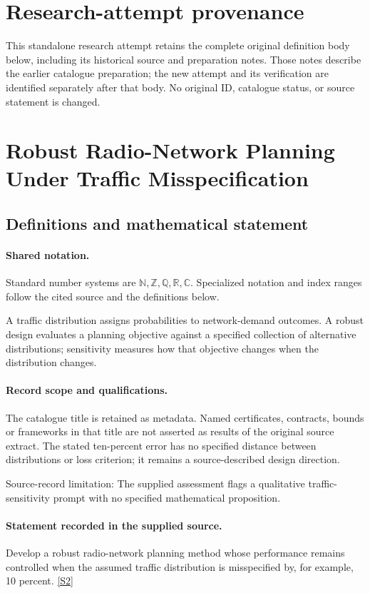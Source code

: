 \documentclass[11pt]{article}
\begin{document}
\section*{Research-attempt provenance}
This standalone research attempt retains the complete original definition body below,
including its historical source and preparation notes. Those notes describe the
earlier catalogue preparation; the new attempt and its verification are identified
separately after that body. No original ID, catalogue status, or source statement is changed.

\section{Robust Radio-Network Planning Under Traffic Misspecification}\label{statement}

\subsection{Definitions and mathematical statement}

\paragraph{Shared notation.}Standard number systems are $\mathbb N,\mathbb Z,\mathbb Q,\mathbb R,\mathbb C$. Specialized notation and index ranges follow the cited source and the definitions below.


A traffic distribution assigns probabilities to network-demand outcomes. A robust design evaluates a planning objective against a specified collection of alternative distributions; sensitivity measures how that objective changes when the distribution changes.
\paragraph{Record scope and qualifications.}
The catalogue title is retained as metadata. Named certificates, contracts, bounds or frameworks in that title are not asserted as results of the original source extract.
The stated ten-percent error has no specified distance between distributions or loss criterion; it remains a source-described design direction.

Source-record limitation: The supplied assessment flags a qualitative traffic-sensitivity prompt with no specified mathematical proposition.
\paragraph{Statement recorded in the supplied source.}
Develop a robust radio-network planning method whose performance remains controlled when the assumed traffic distribution is misspecified by, for example, 10 percent. \href{https://doi.org/10.4171/owr/2005/02}{[S2]}
\end{document}

